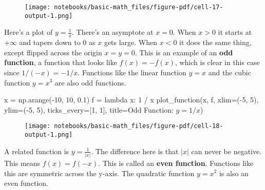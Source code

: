 \documentclass[
  letterpaper,
  DIV=11,
  numbers=noendperiod]{scrreprt}
\newenvironment{Shaded}{\begin{snugshade}}{\end{snugshade}}
\newcommand{\DecValTok}[1]{\textcolor[rgb]{0.68,0.00,0.00}{#1}}
\newcommand{\FloatTok}[1]{\textcolor[rgb]{0.68,0.00,0.00}{#1}}
\newcommand{\KeywordTok}[1]{\textcolor[rgb]{0.00,0.23,0.31}{#1}}
\newcommand{\NormalTok}[1]{\textcolor[rgb]{0.00,0.23,0.31}{#1}}
\newcommand{\OperatorTok}[1]{\textcolor[rgb]{0.37,0.37,0.37}{#1}}
\newcommand{\StringTok}[1]{\textcolor[rgb]{0.13,0.47,0.30}{#1}}
\begin{document}
\begin{figure}[H]

{\centering \texttt{[image: notebooks/basic-math\_files/figure-pdf/cell-17-output-1.png]}

}

\end{figure}

Here's a plot of \(y=\frac{1}{x}\). There's an asymptote at \(x=0\).
When \(x > 0\) it starts at \(+\infty\) and tapers down to \(0\) as
\(x\) gets large. When \(x < 0\) it does the same thing, except flipped
across the origin \(x=y=0\). This is an example of an \textbf{odd
function}, a function that looks like \(f(x)=-f(x)\), which is clear in
this case since \(1/(-x)=-1/x\). Functions like the linear function
\(y=x\) and the cubic function \(y=x^3\) are also odd functions.

\begin{Shaded}
\begin{Highlighting}[]
\NormalTok{x }\OperatorTok{=}\NormalTok{ np.arange(}\OperatorTok{{-}}\DecValTok{10}\NormalTok{, }\DecValTok{10}\NormalTok{, }\FloatTok{0.1}\NormalTok{)}
\NormalTok{f }\OperatorTok{=} \KeywordTok{lambda}\NormalTok{ x: }\DecValTok{1} \OperatorTok{/}\NormalTok{ x}
\NormalTok{plot\_function(x, f, xlim}\OperatorTok{=}\NormalTok{(}\OperatorTok{{-}}\DecValTok{5}\NormalTok{, }\DecValTok{5}\NormalTok{), ylim}\OperatorTok{=}\NormalTok{(}\OperatorTok{{-}}\DecValTok{5}\NormalTok{, }\DecValTok{5}\NormalTok{), ticks\_every}\OperatorTok{=}\NormalTok{[}\DecValTok{1}\NormalTok{, }\DecValTok{1}\NormalTok{], }
\NormalTok{              title}\OperatorTok{=}\StringTok{\textquotesingle{}Odd Function: $y=1/x$\textquotesingle{}}\NormalTok{)}
\end{Highlighting}
\end{Shaded}

\begin{figure}[H]

{\centering \texttt{[image: notebooks/basic-math\_files/figure-pdf/cell-18-output-1.png]}

}

\end{figure}

A related function is \(y=\frac{1}{|x|}\). The difference here is that
\(|x|\) can never be negative. This means \(f(x)=f(-x)\). This is called
an \textbf{even function}. Functions like this are symmetric across the
y-axis. The quadratic function \(y=x^2\) is also an even function.
\end{document}
